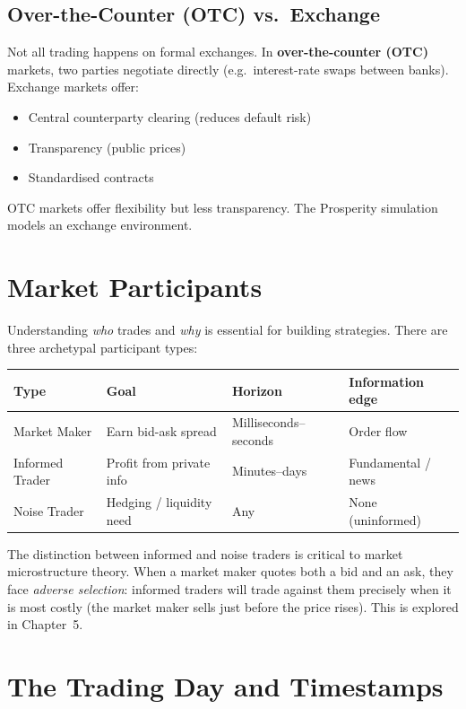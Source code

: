 \documentclass[12pt,a4paper,openany]{report}
\theoremstyle{definition}
\begin{document}
\subsection{Over-the-Counter (OTC) vs.\ Exchange}

Not all trading happens on formal exchanges. In \textbf{over-the-counter (OTC)} markets, two parties negotiate directly (e.g.\ interest-rate swaps between banks). Exchange markets offer:
\begin{itemize}
  \item Central counterparty clearing (reduces default risk)
  \item Transparency (public prices)
  \item Standardised contracts
\end{itemize}
OTC markets offer flexibility but less transparency. The Prosperity simulation models an exchange environment.

\section{Market Participants}

Understanding \emph{who} trades and \emph{why} is essential for building strategies. There are three archetypal participant types:

\begin{center}
\begin{tabular}{llll}
\toprule
\textbf{Type} & \textbf{Goal} & \textbf{Horizon} & \textbf{Information edge} \\
\midrule
Market Maker  & Earn bid-ask spread & Milliseconds--seconds & Order flow \\
Informed Trader & Profit from private info & Minutes--days & Fundamental / news \\
Noise Trader  & Hedging / liquidity need & Any & None (uninformed) \\
\bottomrule
\end{tabular}
\end{center}

The distinction between informed and noise traders is critical to market microstructure theory. When a market maker quotes both a bid and an ask, they face \emph{adverse selection}: informed traders will trade against them precisely when it is most costly (the market maker sells just before the price rises). This is explored in Chapter~5.

\section{The Trading Day and Timestamps}
\end{document}
